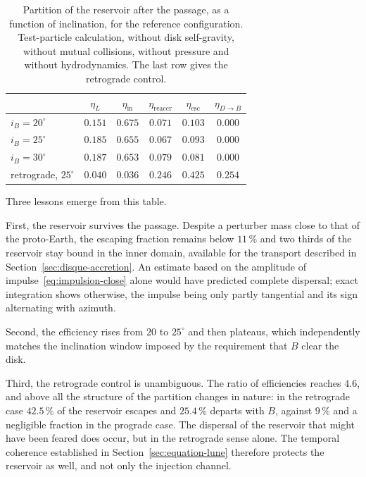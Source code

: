 \documentclass[11pt,a4paper,openany]{report}
\begin{document}
\begin{table}[htbp]
\centering
\small
\caption{Partition of the reservoir after the passage, as a function of inclination, for the
reference configuration. Test-particle calculation, without disk self-gravity, without mutual
collisions, without pressure and without hydrodynamics. The last row gives the retrograde control.}
\label{tab:pilot-etaL}
\begin{tabular}{l|ccccc}
\toprule
& $\eta_L$ & $\eta_{\mathrm{in}}$ & $\eta_{\mathrm{reaccr}}$ & $\eta_{\mathrm{esc}}$ &
$\eta_{D\to B}$ \\
\midrule
$i_B=20^\circ$ & $0.151$ & $0.675$ & $0.071$ & $0.103$ & $0.000$ \\
$i_B=25^\circ$ & $0.185$ & $0.655$ & $0.067$ & $0.093$ & $0.000$ \\
$i_B=30^\circ$ & $0.187$ & $0.653$ & $0.079$ & $0.081$ & $0.000$ \\
\midrule
retrograde, $25^\circ$ & $0.040$ & $0.036$ & $0.246$ & $0.425$ & $0.254$ \\
\bottomrule
\end{tabular}
\end{table}

Three lessons emerge from this table.

First, the reservoir survives the passage. Despite a perturber mass close to that of the
proto-Earth, the escaping fraction remains below $11\,\%$ and two thirds of the reservoir stay bound
in the inner domain, available for the transport described in Section~\ref{sec:disque-accretion}. An
estimate based on the amplitude of impulse~\eqref{eq:impulsion-close} alone would have predicted
complete dispersal; exact integration shows otherwise, the impulse being only partly tangential and
its sign alternating with azimuth.

Second, the efficiency rises from $20$ to $25^\circ$ and then plateaus, which independently matches
the inclination window imposed by the requirement that $B$ clear the disk.

Third, the retrograde control is unambiguous. The ratio of efficiencies reaches $4.6$, and above all
the structure of the partition changes in nature: in the retrograde case $42.5\,\%$ of the reservoir
escapes and $25.4\,\%$ departs with $B$, against $9\,\%$ and a negligible fraction in the prograde
case. The dispersal of the reservoir that might have been feared does occur, but in the retrograde
sense alone. The temporal coherence established in Section~\ref{sec:equation-lune} therefore
protects the reservoir as well, and not only the injection channel.
\end{document}
